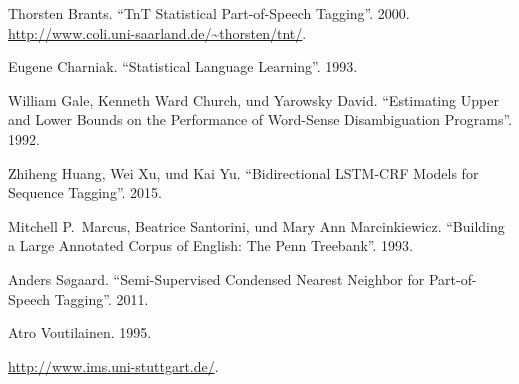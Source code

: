 \documentclass{article}
\begin{document}
{%
\begin{thebibliography}{8}%
\label{sec-bibliography}%

Thorsten Brants. \textquotedblleft{}TnT \textendash{} Statistical Part-of-Speech Tagging\textquotedblright{}. 2000. \href{http://www.coli.uni-saarland.de/~thorsten/tnt/}{{\ttfamily http://\hspace{0pt}www.\hspace{0pt}coli.\hspace{0pt}uni-\hspace{0pt}saarland.\hspace{0pt}de/\hspace{0pt}\textasciitilde{}thorsten/\hspace{0pt}tnt/\hspace{0pt}}}.\label{brants2000}%

Eugene Charniak. \textquotedblleft{}Statistical Language Learning\textquotedblright{}. 1993.\label{charniak1993}%

William Gale, Kenneth Ward Church, und Yarowsky David. \textquotedblleft{}Estimating Upper and Lower Bounds on the Performance of Word-Sense Disambiguation Programs\textquotedblright{}. 1992.\label{gale1992}%

Zhiheng Huang, Wei Xu, und Kai Yu. \textquotedblleft{}Bidirectional LSTM-CRF Models for Sequence Tagging\textquotedblright{}. 2015.\label{huang2015}%

Mitchell P.~Marcus, Beatrice Santorini, und Mary Ann Marcinkiewicz. \textquotedblleft{}Building a Large Annotated Corpus of English: The Penn Treebank\textquotedblright{}. 1993.\label{marcus1993}%

Anders Søgaard. \textquotedblleft{}Semi-Supervised Condensed Nearest Neighbor for Part-of-Speech Tagging\textquotedblright{}. 2011.\label{sogaard2011}%

Atro Voutilainen. 1995.\label{voutilainen1995}%

 \href{http://www.ims.uni-stuttgart.de/}{{\ttfamily http://\hspace{0pt}www.\hspace{0pt}ims.\hspace{0pt}uni-\hspace{0pt}stuttgart.\hspace{0pt}de/\hspace{0pt}}}.\label{imsweb}%
\par%
\end{thebibliography}}%
\end{document}

